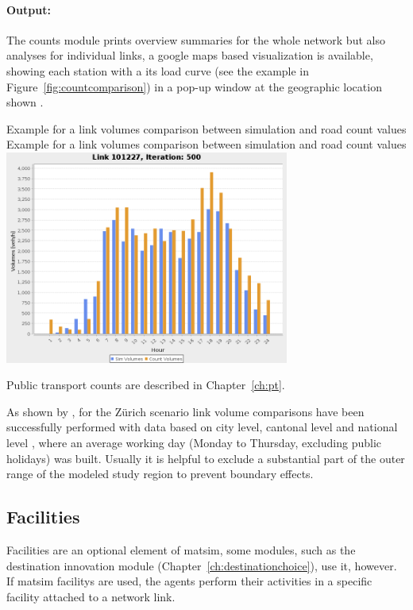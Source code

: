 \paragraph{Output:}
The counts module prints overview summaries for the whole network but also analyses for individual links, \ie a google maps based visualization is available, showing each station with a its load curve (see the example in Figure~\ref{fig:countcomparison}) in a pop-up window at the geographic location shown .

\createfigure%
{Example for a link volumes comparison between simulation and road count values}%
{Example for a link volumes comparison between simulation and road count values}%
{\label{fig:countcomparison}}%
{\includegraphics[width=0.7\textwidth, angle=0]{extending/figures/link101227.png}}%
{}

Public transport counts are described in Chapter~\ref{ch:pt}. 

As shown by \citet[][]{BalmerEtAl_ResRep_bdktzrh_2009}, for the Zürich scenario link volume comparisons have been successfully performed with data based on city level, cantonal level and national level \citep[][]{ASTRA_Webpage_2006}, where an average working day (Monday to Thursday, excluding public holidays) was built. Usually it is helpful to exclude a substantial part of the outer range of the modeled study region to prevent boundary effects.


\subsection{Facilities}
\label{sec:extending-facilities}
Facilities are an optional element of \gls{matsim}, some \glspl{module}, such as the destination innovation module (Chapter~\ref{ch:destinationchoice}), use it, however.
If \gls{matsim} \glspl{facility} are used, the agents perform their activities in a specific \gls{facility} attached to a network link. 

